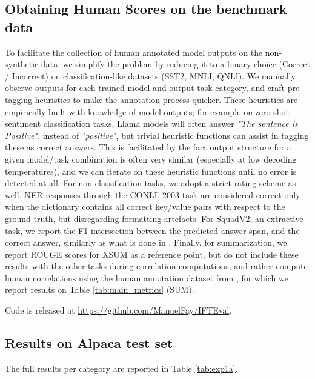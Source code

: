 \subsection{Obtaining Human Scores on the benchmark data} 

To facilitate the collection of human annotated model outputs on the non-synthetic data, we simplify the problem by reducing it to a binary choice (Correct / Incorrect)  on classification-like datasets (SST2, MNLI, QNLI). We manually observe outputs for each trained model and output task category, and craft pre-tagging heuristics to make the annotation process quicker. These heuristics are empirically built with knowledge of model outputs; for example on zero-shot sentiment classification tasks, Llama models will often answer \emph{"The sentence is Positive"}, instead of \emph{"positive"}, but trivial heuristic functions can assist in tagging these as correct answers. This is facilitated by the fact output structure for a given model/task combination is often very similar (especially at low decoding temperatures), and we can iterate on these heuristic functions until no error is detected at all. For non-classification tasks, we adopt a strict rating scheme as well. NER responses through the CONLL 2003 task are considered correct only when the dictionary contains all correct key/value pairs with respect to the ground truth, but disregarding formatting artefacts. For SquadV2, an extractive task, we report the F1 intersection between the predicted answer span, and the correct answer, similarly as what is done in . Finally, for summarization, we report ROUGE scores for XSUM as a reference point, but do not include these results with the other tasks during correlation computations, and rather compute human correlations using the human annotation dataset from , for which we report results on Table  \ref{tab:main_metrics} (SUM).


Code is released at \url{https://github.com/ManuelFay/IFTEval}.

\subsection{Results on Alpaca test set}

The full results per category are reported in Table \ref{tab:exp1a}.

